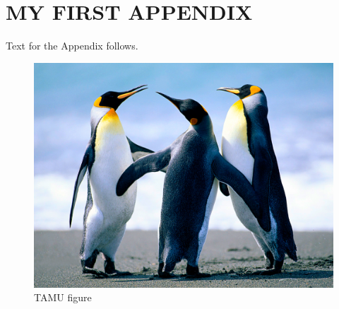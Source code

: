 
\chapter{MY FIRST APPENDIX}

Text for the Appendix follows.

\begin{figure}[H]
\centering
\includegraphics[scale=.50]{figures/Penguins.jpg}
\caption{TAMU figure}
\label{fig:tamu-fig5}
\end{figure}
